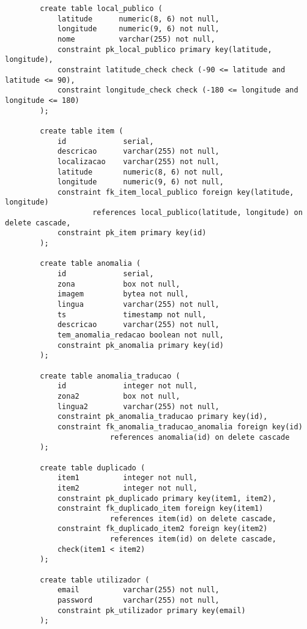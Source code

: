 \documentclass[12pt]{report}
\begin{document}
    \small
    \begin{verbatim}
        create table local_publico (
            latitude      numeric(8, 6) not null,
            longitude     numeric(9, 6) not null,
            nome          varchar(255) not null,
            constraint pk_local_publico primary key(latitude, longitude),
            constraint latitude_check check (-90 <= latitude and latitude <= 90),
            constraint longitude_check check (-180 <= longitude and longitude <= 180)
        );

        create table item (
            id             serial,
            descricao      varchar(255) not null,
            localizacao    varchar(255) not null,    
            latitude       numeric(8, 6) not null,
            longitude      numeric(9, 6) not null,
            constraint fk_item_local_publico foreign key(latitude, longitude)
                    references local_publico(latitude, longitude) on delete cascade,
            constraint pk_item primary key(id)
        );

        create table anomalia (
            id             serial,
            zona           box not null,
            imagem         bytea not null,
            lingua         varchar(255) not null,
            ts             timestamp not null,
            descricao      varchar(255) not null,
            tem_anomalia_redacao boolean not null,
            constraint pk_anomalia primary key(id)
        );

        create table anomalia_traducao (
            id             integer not null,
            zona2          box not null,
            lingua2        varchar(255) not null,
            constraint pk_anomalia_traducao primary key(id),
            constraint fk_anomalia_traducao_anomalia foreign key(id)
                        references anomalia(id) on delete cascade
        );

        create table duplicado (
            item1          integer not null,
            item2          integer not null,
            constraint pk_duplicado primary key(item1, item2),
            constraint fk_duplicado_item foreign key(item1) 
                        references item(id) on delete cascade,
            constraint fk_duplicado_item2 foreign key(item2) 
                        references item(id) on delete cascade,                    
            check(item1 < item2)
        );

        create table utilizador (
            email          varchar(255) not null,
            password       varchar(255) not null,
            constraint pk_utilizador primary key(email)         
        );


\end{verbatim}
\end{document}
